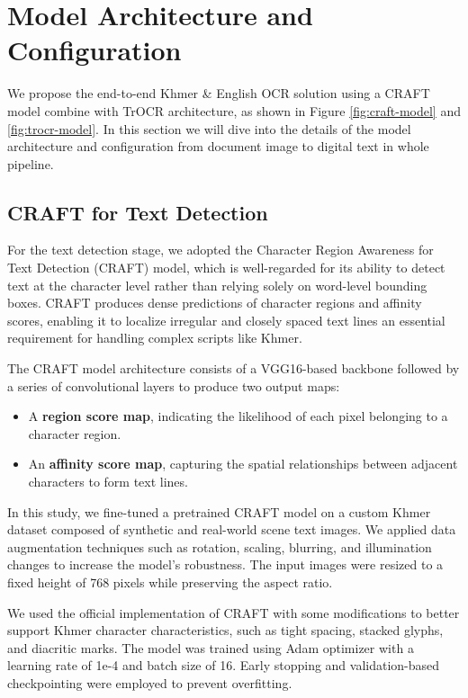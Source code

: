 \section{Model Architecture and Configuration}
\label{sec:architecture}
We propose the end-to-end Khmer \& English OCR solution using a CRAFT model combine
with TrOCR architecture, as shown in Figure \ref{fig:craft-model} and \ref{fig:trocr-model}.
In this section we will dive into the details of the model architecture and configuration
from document image to digital text in whole pipeline.

\subsection{CRAFT for Text Detection}
\label{subsec:craft}

For the text detection stage, we adopted the Character Region Awareness for Text 
Detection (CRAFT) model, which is well-regarded for its ability to detect text at 
the character level rather than relying solely on word-level bounding boxes. 
CRAFT produces dense predictions of character regions and affinity scores, 
enabling it to localize irregular and closely spaced text lines an essential 
requirement for handling complex scripts like Khmer.

The CRAFT model architecture consists of a VGG16-based backbone followed by a series 
of convolutional layers to produce two output maps:
\begin{itemize}
\item A \textbf{region score map}, indicating the likelihood of each pixel belonging 
to a character region.
\item An \textbf{affinity score map}, capturing the spatial relationships between 
adjacent characters to form text lines.
\end{itemize}

In this study, we fine-tuned a pretrained CRAFT model on a custom Khmer dataset 
composed of synthetic and real-world scene text images. We applied data augmentation 
techniques such as rotation, scaling, blurring, and illumination changes to increase 
the model's robustness. The input images were resized to a fixed height of 768 pixels 
while preserving the aspect ratio.

We used the official implementation of CRAFT with some modifications to better support
Khmer character characteristics, such as tight spacing, stacked glyphs, and diacritic 
marks. The model was trained using Adam optimizer with a learning rate of 1e-4 and batch 
size of 16. Early stopping and validation-based checkpointing were employed to 
prevent overfitting.

